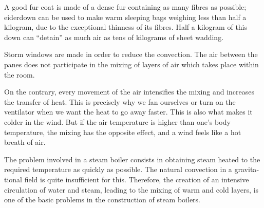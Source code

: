 A good fur coat is made of a dense fur containing as many fibres as possible; eiderdown can be used to make warm sleeping bags weighing less than half a kilogram, due to the exceptional thinness of its fibres. Half a kilo­gram of this down can ``detain'' as much air as tens of kilograms of sheet wadding.

Storm windows are made in order to reduce the con­vection. The air between the panes does not participate in the mixing of layers of air which takes place within the room.

On the contrary, every movement of the air intensifies the mixing and increases the transfer of heat. This is precisely why we fan ourselves or turn on the ventilator when we want the heat to go away faster. This is also what makes it colder in the wind. But if the air temperature is higher than one’s body temperature, the mixing has the opposite effect, and a wind feels like a hot breath of air.

The problem involved in a steam boiler consists in obtaining steam heated to the required temperature as quickly as possible. The natural convection in a gravita­tional field is quite insufficient for this. Therefore, the creation of an intensive circulation of water and steam, leading to the mixing of warm and cold layers, is one of the basic problems in the construction of steam boilers.
